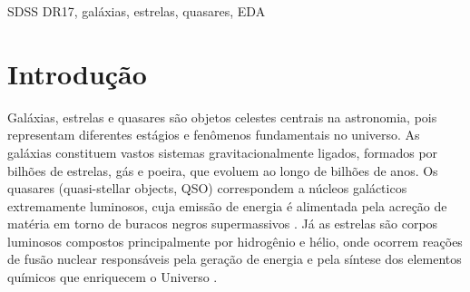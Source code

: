 \documentclass[conference]{IEEEtran}
\begin{document}
\begin{abstract}
[A FAZER] Lorem ipsum dolor sit amet, consectetur adipiscing elit, sed do eiusmod tempor incididunt ut labore et dolore magna aliqua. Ut enim ad minim veniam, quis nostrud exercitation ullamco laboris nisi ut aliquip ex ea commodo consequat. Duis aute irure dolor in reprehenderit in voluptate velit esse cillum dolore eu fugiat nulla pariatur. Excepteur sint occaecat cupidatat non proident, sunt in culpa qui officia deserunt mollit anim id est laborum. Sed ut perspiciatis unde omnis iste natus error sit voluptatem accusantium doloremque laudantium, totam rem aperiam, eaque ipsa quae ab illo inventore veritatis et quasi architecto beatae vitae dicta sunt explicabo. Nemo enim ipsam voluptatem quia voluptas sit aspernatur aut odit aut fugit, sed quia consequuntur magni dolores eos qui ratione voluptatem sequi nesciunt. Neque porro quisquam est, qui dolorem ipsum quia dolor sit amet, consectetur, adipisci velit, sed quia non numquam eius modi tempora incidunt ut labore et dolore magnam aliquam quaerat voluptatem.
\end{abstract}
\vspace{5pt}
\begin{IEEEkeywords}
 SDSS DR17, galáxias, estrelas, quasares, EDA
\end{IEEEkeywords}

\section{Introdução}

Galáxias, estrelas e quasares são objetos celestes centrais na astronomia, pois representam diferentes estágios e fenômenos fundamentais no universo. As galáxias constituem vastos sistemas gravitacionalmente ligados, formados por bilhões de estrelas, gás e poeira, que evoluem ao longo de bilhões de anos. Os quasares (quasi-stellar objects, QSO) correspondem a núcleos galácticos extremamente luminosos, cuja emissão de energia é alimentada pela acreção de matéria em torno de buracos negros supermassivos \cite{b1}. Já as estrelas são corpos luminosos compostos principalmente por hidrogênio e hélio, onde ocorrem reações de fusão nuclear responsáveis pela geração de energia e pela síntese dos elementos químicos que enriquecem o Universo \cite{b2}.
\end{document}
